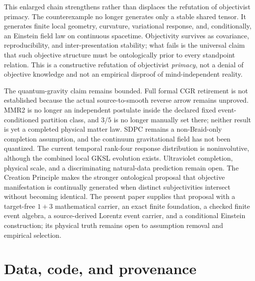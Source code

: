 \documentclass[11pt]{article}
\theoremstyle{definition}
\theoremstyle{remark}
\begin{document}
This enlarged chain strengthens rather than displaces the refutation of objectivist primacy. The counterexample no longer generates only a stable shared tensor. It generates finite local geometry, curvature, variational response, and, conditionally, an Einstein field law on continuous spacetime. Objectivity survives as covariance, reproducibility, and inter-presentation stability; what fails is the universal claim that such objective structure must be ontologically prior to every standpoint relation. This is a constructive refutation of objectivist \emph{primacy}, not a denial of objective knowledge and not an empirical disproof of mind-independent reality.

The quantum-gravity claim remains bounded. Full formal CGR retirement is not established because the actual source-to-smooth reverse arrow remains unproved. MMR2 is no longer an independent postulate inside the declared fixed event-conditioned partition class, and $3/5$ is no longer manually set there; neither result is yet a completed physical matter law. SDPC remains a non-Braid-only completion assumption, and the continuum gravitational field has not been quantized. The current temporal rank-four response distribution is noninvolutive, although the combined local GKSL evolution exists. Ultraviolet completion, physical scale, and a discriminating natural-data prediction remain open. The Creation Principle makes the stronger ontological proposal that objective manifestation is continually generated when distinct subjectivities intersect without becoming identical. The present paper supplies that proposal with a target-free $1+3$ mathematical carrier, an exact finite foundation, a checked finite event algebra, a source-derived Lorentz event carrier, and a conditional Einstein construction; its physical truth remains open to assumption removal and empirical selection.

\section*{Data, code, and provenance}
\end{document}
